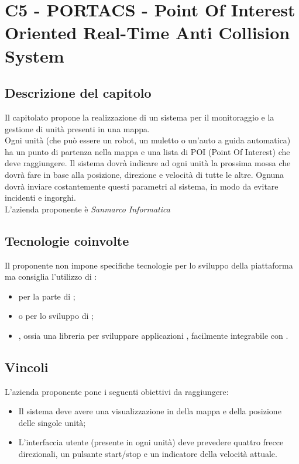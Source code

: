 \section{C5 - PORTACS - Point Of Interest Oriented Real-Time Anti Collision System}

\subsection{Descrizione del capitolo}
Il capitolato propone la realizzazione di un sistema per il monitoraggio e la gestione di unità presenti in una mappa.\\
Ogni unità (che può essere un robot, un muletto o un'auto a guida automatica) ha un punto di partenza nella mappa e una lista di POI (Point Of Interest) che deve raggiungere.
Il sistema dovrà indicare ad ogni unità la prossima mossa che dovrà fare in base alla posizione, direzione e velocità di tutte le altre. Ognuna dovrà inviare costantemente questi parametri al sistema, in modo da evitare incidenti e ingorghi.\\
L'azienda proponente è \textit{Sanmarco Informatica}

\subsection{Tecnologie coinvolte}
Il proponente non impone specifiche tecnologie per lo sviluppo della piattaforma ma consiglia l'utilizzo di :
\begin{itemize}
\item {} per la parte di ;
\item {} o  per lo sviluppo di ;
\item {}, ossia una libreria per sviluppare applicazioni , facilmente integrabile con .
\end{itemize}

\subsection{Vincoli}
L'azienda proponente pone i seguenti obiettivi da raggiungere:

\begin{itemize}
\item Il sistema deve avere una visualizzazione in  della mappa e della posizione delle singole unità;
\item L'interfaccia utente (presente in ogni unità) deve prevedere quattro frecce direzionali, un pulsante start/stop e un indicatore della velocità attuale.
\end{itemize}


